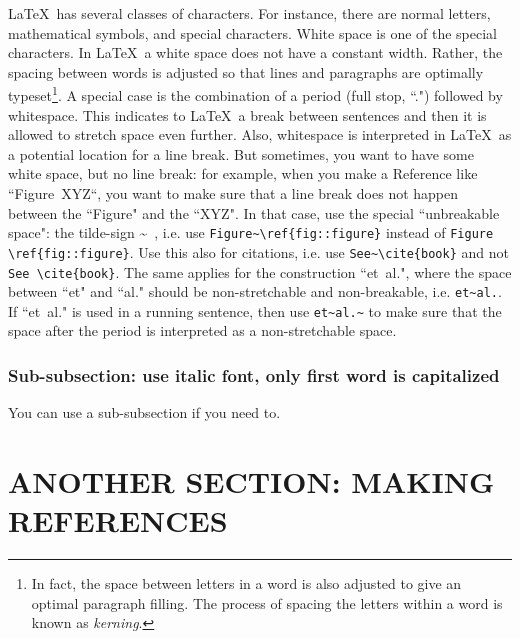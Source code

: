 \documentclass[12pt]{article}
\begin{document}
\LaTeX\ has several classes of characters. For instance, there are normal letters, mathematical symbols, and special characters. White space is one of the special characters. In \LaTeX\, a white space does not have a constant width. Rather, the spacing between words is adjusted so that lines and paragraphs are optimally typeset\footnote{In fact, the space between letters in a word is also adjusted to give an optimal paragraph filling. The process of spacing the letters within a word is known as \emph{kerning}.}. A special case is the combination of a period (full stop, ``.") followed by whitespace. This indicates to \LaTeX\ a break between sentences and then it is allowed to stretch space even further. Also, whitespace is interpreted in \LaTeX\ as a potential location for a line break. But sometimes, you want to have some white space, but no line break: for example, when you make a Reference like ``Figure~XYZ``, you want to make sure that a line break does not happen between the ``Figure" and the ``XYZ". In that case, use the special ``unbreakable space": the tilde-sign \~~, i.e. use \verb|Figure~\ref{fig::figure}| instead of \verb|Figure \ref{fig::figure}|. Use this also for citations, i.e. use \verb|See~\cite{book}| and not \verb|See \cite{book}|. The same applies for the construction ``et~al.", where the space between ``et" and ``al." should be non-stretchable and non-breakable, i.e. \verb|et~al.|. If ``et~al." is used in a running sentence, then use \verb|et~al.~| to make sure that the space after the period is interpreted as a non-stretchable space.

%
\subsubsection{Sub-subsection: use italic font, only first word is capitalized} 
\label{subsubsect::minor}

You can use a sub-subsection if you need to.

%
\section{ANOTHER SECTION: MAKING REFERENCES} 
\label{sect::references}
\end{document}
